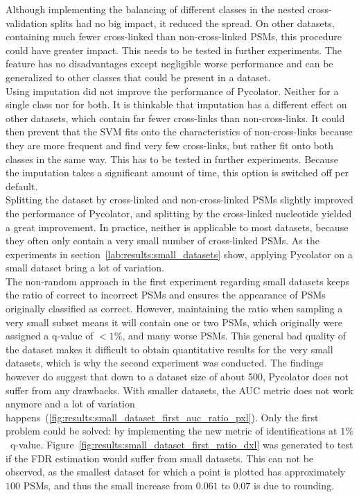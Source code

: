 Although implementing the balancing of different classes in the nested cross-validation splits had no big impact, it reduced the spread. On other datasets, containing much fewer cross-linked than non-cross-linked PSMs, this procedure could have greater impact. This needs to be tested in further experiments. The feature has no disadvantages except negligible worse performance and can be generalized to other classes that could be present in a dataset.\\
Using imputation did not improve the performance of Pycolator. Neither for a single class nor for both. It is thinkable that imputation has a different effect on other datasets, which contain far fewer cross-links than non-cross-links. It could then prevent that the SVM fits onto the characteristics of non-cross-links because they are more frequent and find very few cross-links, but rather fit onto both classes in the same way. This has to be tested in further experiments. Because the imputation takes a significant amount of time, this option is switched off per default.\\
Splitting the dataset by cross-linked and non-cross-linked PSMs slightly improved the performance of Pycolator, and splitting by the cross-linked nucleotide yielded a great improvement. In practice, neither is applicable to most datasets, because they often only contain a very small number of cross-linked PSMs. As the experiments in section~\ref{lab:results:small_datasets} show, applying Pycolator on a small dataset bring a lot of variation.\\
The non-random approach in the first experiment regarding small datasets keeps the ratio of correct to incorrect PSMs and ensures the appearance of PSMs originally classified as correct. However, maintaining the ratio when sampling a very small subset means it will contain one or two PSMs, which originally were assigned a q-value of $<1\%$, and many worse PSMs. This general bad quality of the dataset makes it difficult to obtain quantitative results for the very small datasets, which is why the second experiment was conducted. The findings however do suggest that down to a dataset size of about 500, Pycolator does not suffer from any drawbacks. With smaller datasets, the AUC metric does not work anymore and a lot of variation happens~(\ref{fig:results:small_dataset_first_auc_ratio_pxl}). Only the first problem could be solved: by implementing the new metric of identifications at $1\%$~q-value. Figure~\ref{fig:results:small_dataset_first_ratio_dxl} was generated to test if the FDR estimation would suffer from small datasets. This can not be observed, as the smallest dataset for which a point is plotted has approximately $100$ PSMs, and thus the small increase from $0.061$ to $0.07$ is due to rounding.\\
